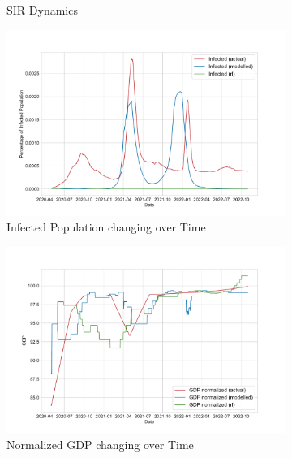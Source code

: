 \documentclass[tikz,fleqn,12pt]{wlscirep}
\begin{document}
\begin{figure}[htbp!]
\begin{subfigure}[t]{0.48\textwidth}
    \caption{SIR Dynamics}
  \end{subfigure}
  \label{fig:175975_rl_sir}
  \hfill
  \begin{subfigure}[t]{0.48\textwidth}
    \centering
    \includegraphics[width=\linewidth]{images/175975/rl_i.pdf}
    \caption{Infected Population changing over Time}
  \end{subfigure}
  \label{fig:175975_rl_i}
  \hfill
  \begin{subfigure}[t]{0.48\textwidth}
    \centering
    \includegraphics[width=\linewidth]{images/175975/rl_gdp.pdf}
    \caption{Normalized GDP changing over Time}
  \end{subfigure}
  \label{fig:175975_rl_gdp}
  \hfill
  \begin{subfigure}[t]{0.48\textwidth}
    \centering

\end{subfigure}
\end{figure}
\end{document}
